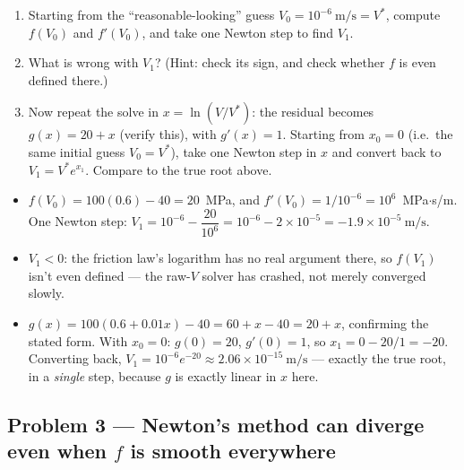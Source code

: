\begin{enumerate}[label=(\alph*)]
\item Starting from the ``reasonable-looking'' guess $V_0 = 10^{-6}\ \mathrm{m/s} = V^\ast$, compute $f(V_0)$ and $f'(V_0)$, and take one Newton step to find $V_1$.
\item What is wrong with $V_1$? (Hint: check its sign, and check whether $f$ is even defined there.)
\item Now repeat the solve in $x = \ln(V/V^\ast)$: the residual becomes $g(x) = 20 + x$ (verify this), with $g'(x)=1$. Starting from $x_0=0$ (i.e.\ the same initial guess $V_0=V^\ast$), take one Newton step in $x$ and convert back to $V_1 = V^\ast e^{x_1}$. Compare to the true root above.
\end{enumerate}

\solution
\begin{itemize}
\item[(a)] $f(V_0) = 100(0.6) - 40 = 20$~MPa, and $f'(V_0) = 1/10^{-6} = 10^{6}$~MPa$\cdot$s/m. One Newton step: $V_1 = 10^{-6} - \dfrac{20}{10^{6}} = 10^{-6} - 2\times10^{-5} = -1.9\times10^{-5}\ \mathrm{m/s}$.
\item[(b)] $V_1<0$: the friction law's logarithm has no real argument there, so $f(V_1)$ isn't even defined --- the raw-$V$ solver has crashed, not merely converged slowly.
\item[(c)] $g(x) = 100(0.6+0.01x)-40 = 60+x-40 = 20+x$, confirming the stated form. With $x_0=0$: $g(0)=20$, $g'(0)=1$, so $x_1 = 0 - 20/1 = -20$. Converting back, $V_1 = 10^{-6}e^{-20} \approx 2.06\times10^{-15}\ \mathrm{m/s}$ --- exactly the true root, in a \emph{single} step, because $g$ is exactly linear in $x$ here.
\end{itemize}


\subsection*{Problem 3 --- Newton's method can diverge even when $f$ is smooth everywhere}

